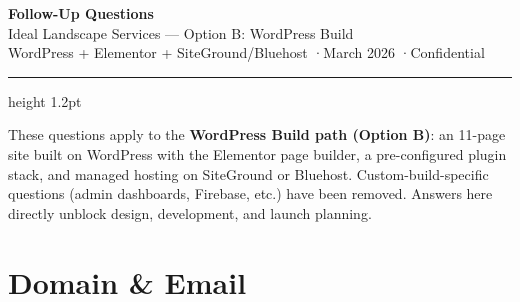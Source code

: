 \documentclass[11pt, letterpaper]{article}
\begin{document}

\begin{center}
  {\LARGE\bfseries\color{black} Follow-Up Questions}\\[4pt]
  {\large\color{darkgray} Ideal Landscape Services --- Option B: WordPress Build}\\[6pt]
  {\small\color{midgray} WordPress + Elementor + SiteGround/Bluehost \quad·\quad March 2026 \quad·\quad Confidential}
\end{center}

\vspace{4pt}
{\color{accent}\hrule height 1.2pt}
\vspace{10pt}

These questions apply to the \textbf{WordPress Build path (Option B)}: an
11-page site built on WordPress with the Elementor page builder, a pre-configured
plugin stack, and managed hosting on SiteGround or Bluehost. Custom-build-specific
questions (admin dashboards, Firebase, etc.) have been removed. Answers here
directly unblock design, development, and launch planning.

\vspace{4pt}

\section{Domain \& Email}
\end{document}
